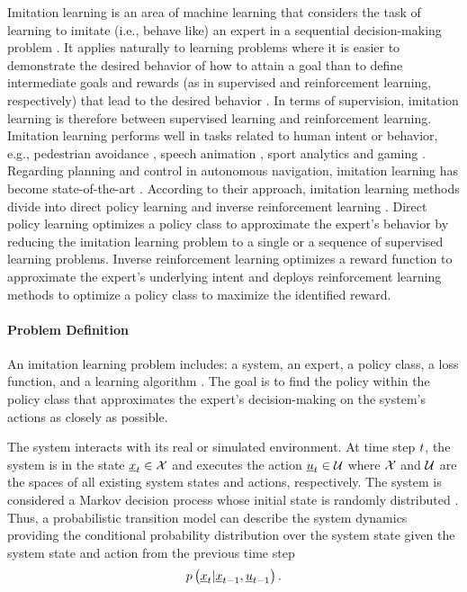 Imitation learning is an area of machine learning 
that considers the task of learning to
imitate (i.e., behave like) an expert 
in a sequential decision-making problem \cite{yue2018imitation}.
It applies naturally to learning problems where it is easier 
to demonstrate the desired behavior of how to attain a goal
than to define intermediate goals and rewards 
(as in supervised and reinforcement learning, respectively)
that lead to the desired behavior \cite{Nikolov2018}.
In terms of supervision,
imitation learning is therefore
between supervised learning
and reinforcement learning.
Imitation learning performs well in tasks
related to human intent or behavior, e.g.,
pedestrian avoidance \cite{Ziebart2009},
speech animation \cite{Taylor2017},
sport analytics \cite{le2017data}
and gaming \cite{thurau2004imitation}.
Regarding
planning and control
in autonomous navigation,
imitation learning has become 
state-of-the-art \cite{Mero2022}.
According to their approach, 
imitation learning methods 
divide into direct policy learning and 
inverse reinforcement learning \cite{RobotAutonomy2}.
Direct policy learning 
optimizes a policy class 
to approximate the expert's behavior
by reducing the imitation learning problem
to a single or a sequence of supervised learning problems.
Inverse reinforcement learning
optimizes a reward function 
to approximate the expert's underlying intent
and deploys reinforcement learning methods
to optimize a policy class to maximize the identified reward. 







\paragraph*{Problem Definition}$\ $\\
An imitation learning problem includes: 
a system, 
an expert, 
a policy class, 
a loss function, 
and a learning algorithm \cite{yue2018imitation}.
The goal is to find the policy 
within the policy class 
that approximates the expert's decision-making 
on the system's actions
as closely as possible. 

The system interacts with its real or simulated environment.
At time step $t$,
the system is in the state $\underline{x}_t \in \mathcal{X}$
and executes the action $\underline{u}_t \in \mathcal{U}$
where $\mathcal{X}$ and $\mathcal{U}$ are the 
spaces of all existing system states and actions, respectively.
The system is considered a Markov decision process
whose initial state is randomly distributed 
\cite{RobotAutonomy2}.
Thus, a probabilistic transition model can 
describe the system dynamics 
providing the conditional probability distribution 
over the system state 
given the system state and action from the previous time step
\begin{align}
    p \left({
        \underline{x}_t | \underline{x}_{t -1}, \underline{u}_{t -1}
    }\right).
\end{align}

